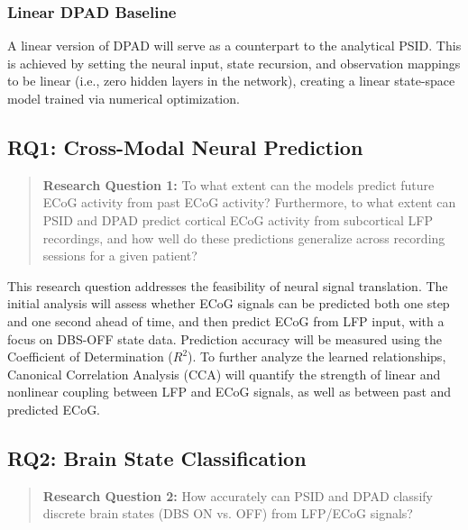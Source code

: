\documentclass[12pt, letterpaper]{article}
\begin{document}
\subsubsection{Linear DPAD Baseline}

A linear version of DPAD will serve as a counterpart to the analytical PSID. This is achieved by setting the neural input, state recursion, and observation mappings to be linear (i.e., zero hidden layers in the network), creating a linear state-space model trained via numerical optimization.

\subsection{RQ1: Cross-Modal Neural Prediction}

\begin{quote}

    \textbf{Research Question 1:} To what extent can the models predict future ECoG activity from past ECoG activity? Furthermore, to what extent can PSID and DPAD predict cortical ECoG activity from subcortical LFP recordings, and how well do these predictions generalize across recording sessions for a given patient?

\end{quote}

This research question addresses the feasibility of neural signal translation. The initial analysis will assess whether ECoG signals can be predicted both one step and one second ahead of time, and then predict ECoG from LFP input, with a focus on DBS-OFF state data. Prediction accuracy will be measured using the Coefficient of Determination ($R^2$). To further analyze the learned relationships, Canonical Correlation Analysis (CCA) will quantify the strength of linear and nonlinear coupling between LFP and ECoG signals, as well as between past and predicted ECoG.

\subsection{RQ2: Brain State Classification}

\begin{quote}

    \textbf{Research Question 2:} How accurately can PSID and DPAD classify discrete brain states (DBS ON vs. OFF) from LFP/ECoG signals?

\end{quote}
\end{document}
